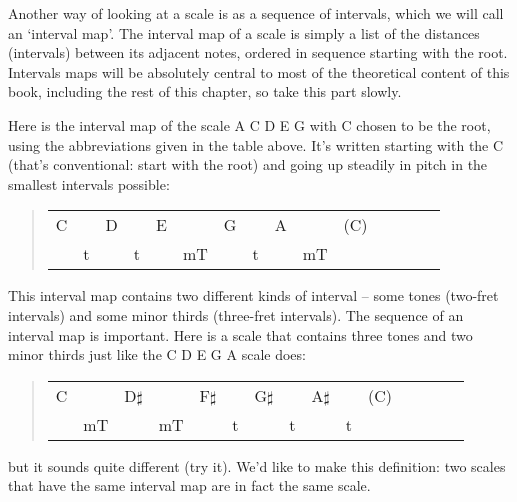 \documentclass[english]{./gbook}
\begin{document}
\begin{large}
Another way of looking at a scale is as a sequence of intervals, which we will call an `interval map'. The interval map of a scale is simply a list of the distances (intervals) between its adjacent notes, ordered in sequence starting with the root. Intervals maps will be absolutely central to most of the theoretical content of this book, including the rest of this chapter, so take this part slowly.

Here is the interval map of the scale A C D E G with C chosen to be the root, using the abbreviations given in the table above. It's written starting with the C (that's conventional: start with the root) and going up steadily in pitch in the smallest intervals possible:
\begin{quote}
\begin{tabular}{rrrrrrrrrrrrrrr}
	C &&D &&E &&G &&A &&(C)\\
	 &t && t&&mT &&t &&mT &
\end{tabular}
\end{quote}
This interval map contains two different kinds of interval -- some tones (two-fret intervals) and some minor thirds (three-fret intervals). The sequence of an interval map is important. Here is a scale that contains three tones and two minor thirds just like the C D E G A scale does:
\begin{quote}
\begin{tabular}{rrrrrrrrrrrrrrr}
	C && D$\sharp$ &&F$\sharp$ &&G$\sharp$ && A$\sharp$ &&(C)\\
	 & mT &&mT && t && t&& t &
\end{tabular}
\end{quote}
but it sounds quite different (try it). We'd like to make this definition: two scales that have the same interval map are in fact the same scale. 


\end{large}
\end{document}
